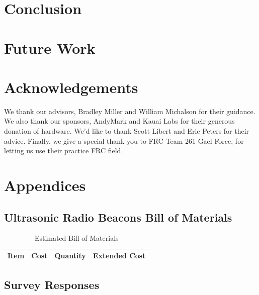 \documentclass{article}
\begin{document}
\section{Conclusion} \label{section:conclusion}




\section{Future Work} \label{section:future_work}




\section{Acknowledgements}

  We thank our advisors, Bradley Miller and William Michalson for their guidance. We also thank our sponsors, AndyMark and Kauai Labs for their generous donation of hardware. We'd like to thank Scott Libert and Eric Peters for their advice. Finally, we give a special thank you to FRC Team 261 Gael Force, for letting us use their practice FRC field.






\section{Appendices}

  \subsection{Ultrasonic Radio Beacons Bill of Materials} \label{appendix:beacon_bom}

    \begin{table}[H]
      \centering
      \begin{tabular}{|c|c|c|c|} \hline
        Item & Cost & Quantity & Extended Cost \\ \hline
      \end{tabular}
      \caption{Estimated Bill of Materials}
      \label{table:beacon_bom}
    \end{table}

  \subsection{Survey Responses}\label{appendix:survey}
\end{document}
